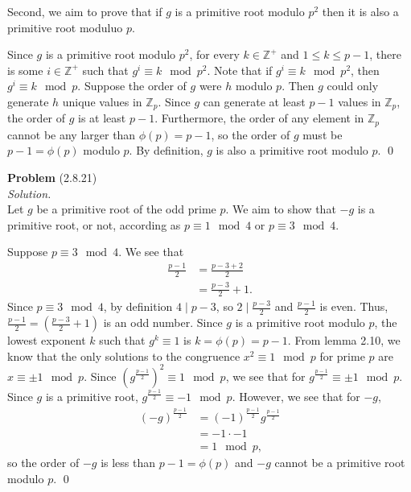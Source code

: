 \documentclass[12 pt]{amsart}
\begin{document}
  Second, we aim to prove that if $g$ is a primitive root
  modulo $p^2$ then it is also a primitive root moduluo $p$.

  Since $g$ is a primitive root modulo $p^2$, for every
  $k \in \mathbb{Z}^+$ and 
  $1 \leq k \leq p-1$,  there is some
  $i \in \mathbb{Z}^+$ such that $g^i \equiv k \mod p^2$. 
  Note that if $g^i \equiv k \mod p^2$, then 
  $g^i \equiv k \mod p$. 
  Suppose the order of $g$ were $h$ modulo $p$. 
  Then $g$ could only generate $h$ unique values in $\mathbb{Z}_p$.
  Since $g$ can generate at least $p-1$ values in $\mathbb{Z}_p$, 
  the order of $g$ is at least $p-1$. 
  Furthermore, the order of any element in $\mathbb{Z}_p$ cannot
  be any larger than $\phi(p) = p-1$, so the order of $g$ must
  be $p-1 = \phi(p)$ modulo $p$. 
  By definition, $g$ is also a primitive root modulo $p$. 
  \qed


\vfill
\newpage



\phantom{\quad} \vfill
\noindent
\textbf{Problem} (2.8.21) \\[4ex]
\emph{Solution.} \\[2ex]
  Let $g$ be a primitive root of the odd prime $p$.
  We aim to show that $-g$ is a primitive root, or not,
  according as $p \equiv 1 \mod 4$ or $p \equiv 3 \mod 4$.

  Suppose $p \equiv 3 \mod 4$.
  We see that 
  \begin{align*}
    \frac{p-1}{2} &= \frac{p-3+2}{2} \\
                  &= \frac{p-3}{2} + 1.
  \end{align*}
  Since $p \equiv 3 \mod 4$, by definition
  $4 \mid p - 3$, so $2 \mid \frac{p-3}{2}$
  and $\frac{p-1}{2}$ is even.
  Thus, $\frac{p-1}{2} = \left( \frac{p-3}{2} + 1 \right)$ is an odd number.
  Since $g$ is a primitive root modulo $p$, 
  the lowest exponent $k$ such that $g^k \equiv 1$ is
  $k = \phi(p) = p -1$.
  From lemma 2.10, we know that the only solutions to
  the congruence $x^2 \equiv 1 \mod p$ for prime $p$
  are $x \equiv \pm 1 \mod p$.
  Since $\left( g^{\frac{p-1}{2}} \right)^2 \equiv 1 \mod p$,
  we see that for $g^{\frac{p-1}{2}} \equiv \pm 1 \mod p$.
  Since $g$ is a primitive root,
  $g^{\frac{p-1}{2}} \equiv -1 \mod p$. 
  However, we see that for $-g$, 
  \begin{align*}
    (-g)^{\frac{p-1}{2}} &= (-1)^{\frac{p-1}{2}} g^{\frac{p-1}{2}} \\
                         &= -1 \cdot -1 \\
                         &= 1 \mod p,
  \end{align*}
  so the order of $-g$ is less than $p-1 = \phi(p)$ and $-g$
  cannot be a primitive root modulo $p$.
  \qed
\end{document}
